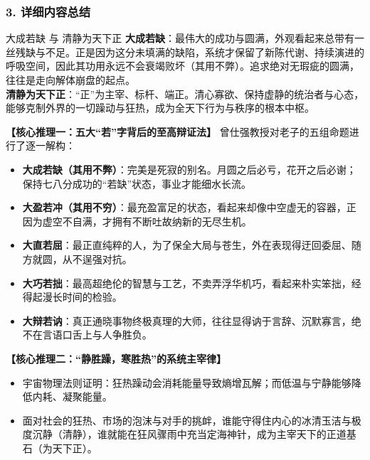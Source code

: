 \subsubsection{3. 详细内容总结}

\begin{ConceptBox}{大成若缺 与 清静为天下正}
\textbf{大成若缺}：最伟大的成功与圆满，外观看起来总带有一丝残缺与不足。正是因为这分未填满的缺陷，系统才保留了新陈代谢、持续演进的呼吸空间，因此其功用永远不会衰竭败坏（其用不弊）。追求绝对无瑕疵的圆满，往往是走向解体崩盘的起点。\\
\textbf{清静为天下正}：“正”为主宰、标杆、端正。清心寡欲、保持虚静的统治者与心态，能够克制外界的一切躁动与狂热，成为全天下行为与秩序的根本中枢。
\end{ConceptBox}

\noindent\textbf{【核心推理一：五大“若”字背后的至高辩证法】}
曾仕强教授对老子的五组命题进行了逐一解构：
\begin{itemize}
    \item \textbf{大成若缺（其用不弊）}：完美是死寂的别名。月圆之后必亏，花开之后必谢；保持七八分成功的“若缺”状态，事业才能细水长流。
    \item \textbf{大盈若冲（其用不穷）}：最充盈富足的状态，看起来却像中空虚无的容器，正因为虚空不自满，才拥有不断吐故纳新的无尽生机。
    \item \textbf{大直若屈}：最正直纯粹的人，为了保全大局与苍生，外在表现得迂回委屈、随方就圆，从不逞强对抗。
    \item \textbf{大巧若拙}：最高超绝伦的智慧与工艺，不卖弄浮华机巧，看起来朴实笨拙，经得起漫长时间的检验。
    \item \textbf{大辩若讷}：真正通晓事物终极真理的大师，往往显得讷于言辞、沉默寡言，绝不在言语口舌上与人争胜负。
\end{itemize}

\noindent\textbf{【核心推理二：“静胜躁，寒胜热”的系统主宰律】}
\begin{itemize}
    \item 宇宙物理法则证明：狂热躁动会消耗能量导致熵增瓦解；而低温与宁静能够降低内耗、凝聚能量。
    \item 面对社会的狂热、市场的泡沫与对手的挑衅，谁能守得住内心的冰清玉洁与极度沉静（清静），谁就能在狂风骤雨中充当定海神针，成为主宰天下的正道基石（为天下正）。
\end{itemize}

